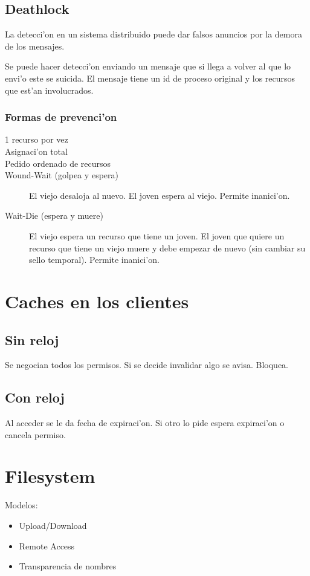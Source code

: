\documentclass[a4paper,spanish]{article}
\begin{document}
\subsection{Deathlock}
La detecci'on en un sistema distribuido puede dar falsos anuncios por la demora
de los mensajes.

Se puede hacer detecci'on enviando un mensaje que si llega a volver al que lo
envi'o este se suicida. El mensaje tiene un id de proceso original y los
recursos que est'an involucrados.

\subsubsection{Formas de prevenci'on}
\begin{description}
	\item[1 recurso por vez]
	\item[Asignaci'on total]
	\item[Pedido ordenado de recursos]
	\item[Wound-Wait (golpea y espera)] El viejo desaloja al nuevo. El
joven espera al viejo. Permite inanici'on.
	\item[Wait-Die (espera y muere)] El viejo espera un recurso que tiene
un joven. El joven que quiere un recurso que tiene un viejo muere y debe
empezar de nuevo (sin cambiar su sello temporal). Permite inanici'on.
\end{description}

\section{Caches en los clientes}
\subsection{Sin reloj}
Se negocian todos los permisos. Si se decide invalidar algo se avisa. Bloquea.

\subsection{Con reloj}
Al acceder se le da fecha de expiraci'on. Si otro lo pide espera expiraci'on o
cancela permiso.
	
\section{Filesystem}
Modelos:
\begin{itemize}
	\item Upload/Download
	\item Remote Access
	\item Transparencia de nombres
\end{itemize}
\end{document}

